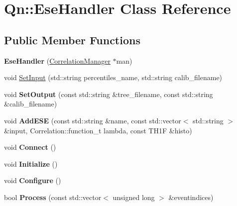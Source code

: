 \hypertarget{classQn_1_1EseHandler}{}\section{Qn\+:\+:Ese\+Handler Class Reference}
\label{classQn_1_1EseHandler}
\subsection*{Public Member Functions}
\begin{DoxyCompactItemize}
\item 
\mbox{\label{classQn_1_1EseHandler_a850d2ba21ed46c6b58db070f8aeebcdd}} 
{\bfseries Ese\+Handler} (\mbox{\hyperlink{classQn_1_1CorrelationManager}{Correlation\+Manager}} $\ast$man)
\item 
void \mbox{\hyperlink{classQn_1_1EseHandler_abf21f1c9e2e1a2c27d6b1ab47ec68129}{Set\+Input}} (std\+::string percentiles\+\_\+name, std\+::string calib\+\_\+filename)
\item 
\mbox{\label{classQn_1_1EseHandler_af0841190bbabe156205c60fcc71f9ce8}} 
void {\bfseries Set\+Output} (const std\+::string \&tree\+\_\+filename, const std\+::string \&calib\+\_\+filename)
\item 
\mbox{\label{classQn_1_1EseHandler_a3c711e44aac8fb825f1d4ef4d3b0516a}} 
void {\bfseries Add\+E\+SE} (const std\+::string \&name, const std\+::vector$<$ std\+::string $>$ \&input, Correlation\+::function\+\_\+t lambda, const T\+H1F \&histo)
\item 
\mbox{\label{classQn_1_1EseHandler_a77b88da6beb8cc6bd09ad532f67ec6bd}} 
void {\bfseries Connect} ()
\item 
\mbox{\label{classQn_1_1EseHandler_a185d3735cf4528256d19f840c67dde33}} 
void {\bfseries Initialize} ()
\item 
\mbox{\label{classQn_1_1EseHandler_ae03099ea62473d19fecbc93e952f14d8}} 
void {\bfseries Configure} ()
\item 
\mbox{\label{classQn_1_1EseHandler_a02e572f6df586a2f222d8a1060d06670}} 
bool {\bfseries Process} (const std\+::vector$<$ unsigned long $>$ \&eventindices)

\end{DoxyCompactItemize}
